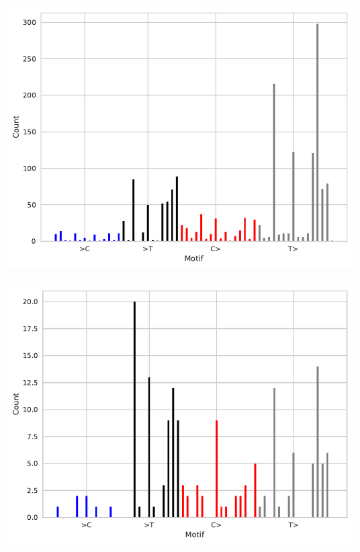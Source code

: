 \documentclass{article}
\begin{document}
\begin{figure}[ht!]
\begin{subfigure}[b]{0.49\textwidth}
        \caption{}
        \label{supfig:synthetic-breast-snv}
    \end{subfigure}
    \hfill
    \begin{subfigure}[b]{0.49\textwidth}
        \includegraphics[width=\textwidth]{figures/synthetic_skin_tumour_1bp_indels}
        \caption{}
        \label{supfig:synthetic-skin-indel}
    \end{subfigure}
    \begin{subfigure}[b]{0.49\textwidth}
        \includegraphics[width=\textwidth]{figures/synthetic_breast_tumour_1bp_indels}
        \caption{}
        \label{supfig:synthetic-breast-indel}
    \end{subfigure}
    \hfill
    \begin{subfigure}[b]{0.49\textwidth}

\end{subfigure}
\end{figure}
\end{document}

